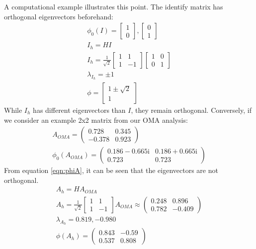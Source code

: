 A computational example illustrates this point. The identify matrix has orthogonal eigenvectors beforehand:
\begin{align}
\phi_0(I)=\begin{bmatrix}
1 \\0
\end{bmatrix},\begin{bmatrix}
0 \\ 1
\end{bmatrix}\\
I_{h}=HI\\
I_{h}=\frac{1}{\sqrt{2}}\begin{bmatrix}
1 & 1\\1 & -1
\end{bmatrix}\begin{bmatrix}
1 & 0\\0 & 1
\end{bmatrix}\\
\lambda_{I_h}=\pm 1\\
\phi=\begin{bmatrix}
1 \pm \sqrt{2} \\ 1
\end{bmatrix}
\end{align}
While $I_h$ has different eigenvectors than $I$, they remain orthogonal. Conversely, if we consider an example 2x2 matrix from our OMA analysis:
\begin{align}
A_{OMA}=\left(\begin{array}{cc} 0.728 & 0.345\\ -0.378 & 0.923 \end{array}\right)\\
\phi_0(A_{OMA})=\left(\begin{array}{cc} 0.186-0.665{}\mathrm{i} & 0.186+0.665{}\mathrm{i}\\ 0.723 & 0.723 \end{array}\right) \label{eqn:phiA}
\end{align}
From equation \ref{eqn:phiA}, it can be seen that the eigenvectors are not orthogonal.
\begin{align}
A_{h}=HA_{OMA}\\
A_{h}=\frac{1}{\sqrt{2}}\begin{bmatrix}
1 & 1\\1 & -1
\end{bmatrix}A_{OMA}\approx \left(\begin{array}{cc} 0.248 & 0.896\\ 0.782 & -0.409 \end{array}\right)\\
\lambda_{A_h}=0.819,-0.980\\
\phi(A_h)=\left(\begin{array}{cc} 0.843 & -0.59\\ 0.537 & 0.808 \end{array}\right)
\end{align}
